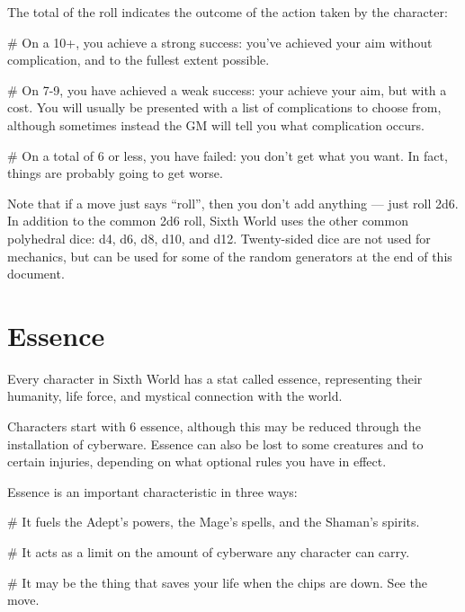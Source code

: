 
The total of the roll indicates the outcome of the action taken by the character:

\begin{easylist}
# On a 10+, you achieve a strong success: you've achieved your aim without complication, and to the fullest extent possible.

# On 7-9, you have achieved a weak success: your achieve your aim, but with a cost. You will usually be presented with a list of complications to choose from, although sometimes instead the GM will tell you what complication occurs.

# On a total of 6 or less, you have failed: you don’t get what you want. In fact, things are probably going to get worse.
\end{easylist}

Note that if a move just says ``roll'', then you don’t add anything — just roll 2d6. In addition to the common 2d6 roll, Sixth World uses the other common polyhedral dice: d4, d6, d8, d10, and d12. Twenty-sided dice are not used for mechanics, but can be used for some of the random generators at the end of this document.


\section{Essence}

Every character in Sixth World has a stat called essence, representing their humanity, life force, and mystical connection with the world.

Characters start with 6 essence, although this may be reduced through the installation of cyberware. Essence can also be lost to some creatures and to certain injuries, depending on what optional rules you have in effect.

Essence is an important characteristic in three ways:

\begin{easylist}
# It fuels the Adept’s powers, the Mage’s spells, and the Shaman’s spirits.

# It acts as a limit on the amount of cyberware any character can carry.

# It may be the thing that saves your life when the chips are down. See the  move.
\end{easylist}


